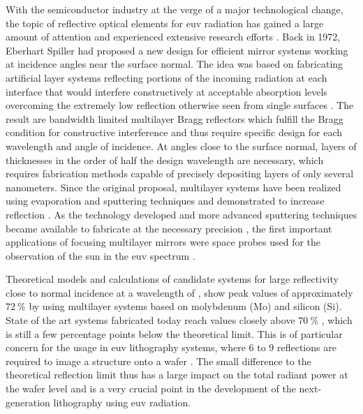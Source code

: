 With the semiconductor industry at the verge of a major technological change, the topic of reflective optical elements for \gls{euv} radiation has gained a large amount of attention and experienced extensive research efforts \cite{bakshi_euv_2009}. Back in 1972, Eberhart Spiller had proposed a new design for efficient mirror systems working at incidence angles near the surface normal. The idea was based on fabricating artificial layer systems reflecting portions of the incoming radiation at each interface that would interfere constructively at acceptable absorption levels overcoming the extremely low reflection otherwise seen from single surfaces \cite{spiller_low-loss_1972}. The result are bandwidth limited multilayer Bragg reflectors which fulfill the Bragg condition for constructive interference and thus require specific design for each wavelength and angle of incidence. At angles close to the surface normal, layers of thicknesses in the order of half the design wavelength are necessary, which requires fabrication methods capable of precisely depositing layers of only several nanometers. Since the original proposal, multilayer systems have been realized using evaporation and sputtering techniques and demonstrated to increase reflection \cite{spiller_reflective_1976, underwood_layered_1981}. As the technology developed and more advanced sputtering techniques became available to fabricate at the necessary precision \cite{stearns_fabrication_1991}, the first important applications of focusing multilayer mirrors were space probes used for the observation of the sun in the \gls{euv} spectrum \cite{chauvineau_description_1992, clette_eit:_1995, spiller_soft_1994}.

Theoretical models and calculations of candidate systems for large reflectivity close to normal incidence at a wavelength of , show peak values of approximately $\SI{72}{\percent}$ by using multilayer systems based on molybdenum (Mo) and silicon (Si). State of the art systems fabricated today reach values closely above $\SI{70}{\percent}$ \cite{barbee_molybdenum-silicon_1985,stearns_fabrication_1991,bajt_improved_2002,braun_grenzflachen-optimierte_2003}, which is still a few percentage points below the theoretical limit. This is of particular concern for the usage in \gls{euv} lithography systems, where $6$ to $9$ reflections are required to image a structure onto a wafer \cite{kaiser_euvl_2008, wagner_euv_2010}. The small difference to the theoretical reflection limit thus has a large impact on the total radiant power at the wafer level and is a very crucial point in the development of the next-generation lithography using \gls{euv} radiation. 

